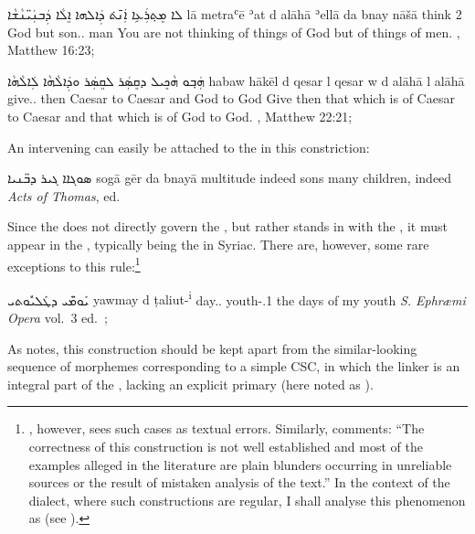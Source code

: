 {{ 
 {ܠܐ ܡܸܬ݂ܪܲܥܹܐ ܐܲܢ̄ܬ݁ ܕܲܐܠܗܐ ܐܸܠܵܐ ܕܲܒܢܲܝ̈ܢܵܫܵܐ}
 {lā metraʿē \cb{}ʾat \zero{} d\cb{} alāhā ʾellā \zero{} da\cb{} bnay\cb{} nāšā}
 {\neg{} think \cb{}2\sg{} \zero{} \lnk\cb{} God but \zero{} \lnk\cb{} son.\pl.\cst\cb{} man}
 {You are not thinking of things of God but of things of men.}
 {\Pesh, Matthew 16:23; \cite[71]{MuraokaSyriac}}

 
 {ܗܲܒ݂ܘ ܗܵܟܸܝܠ ܕܩܸܣܲܪ ܠܩܸܣܲܪ ܘܕܲܐܠܵܗܵܐ ܠܲܐܠܵܗܵܐ}
 {habaw hākēl \zero{} d\cb{} qesar l\cb{} qesar w\cb{} \zero{} d\cb{} alāhā l\cb{} alāhā}
 {give.\imp.\pl{} then \zero{} \lnk\cb{} Caesar to\cb{} Caesar and\cb{} \zero{} \lnk\cb{} God to\cb{} God}
 {Give then that which is of Caesar to Caesar and that which is of God to God.}
 {\Pesh, Matthew 22:21; \cite[71]{MuraokaSyriac}}

\largerpage
 An intervening  can easily be attached to the \prim in this constriction:
 
 {ܣܘܓܐܐ ܓܝܪ ܕܒ̈ܢܝܐ}
 {sogā \cb{}gēr da\cb{} bnayā}
 {multitude \cb{}indeed \lnk\cb{} sons}
 {many children, indeed}
 {\textit{Acts of Thomas}, ed.\ \cite[]{WrightActs}}
 
 
 
 Since the \prim does not directly govern  the \secn, but rather stands in  with the \lnk*, it must appear in the , typically being the  in Syriac.
 There are, however, some rare exceptions to this rule:\footnote{\citet[155, \S 205B, fn. 1]{NoldekeSyriac}, however, sees such cases as textual errors. Similarly, \citet[25, fn. 6]{HopkinsName} comments: \enquote{The correctness of this construction is not well established and most of the examples alleged in the literature are plain blunders occurring in unreliable sources or the result of mistaken analysis of the text.} In the context of the \JUrm {} dialect, where such constructions are regular, I shall analyse  this phenomenon as  (see ).}
 
 {ܝܰܘܡ̈ܰܝ ܕܛܰܠܝܽܘܬܝ}
 {yawmay d\cb{} ṭaliut-\textsuperscript{i}} 
 {day.\pl.\cst{} \lnk\cb{} youth-\poss.1\sg}
 {the days of my youth}
 {\textit{S. Ephræmi Opera} vol.\ 3 ed.\ \cite[429]{AssemanusEphraem}; \cite[339, \S 357g]{DuvalSyriaque}}
 
 As \citet{DuvalSyriaque} notes, this construction should be kept apart from the similar-looking sequence of morphemes corresponding to a simple CSC, in which the linker is an integral part of the \secn, lacking an explicit primary (here noted as \zero). 
 
}}
